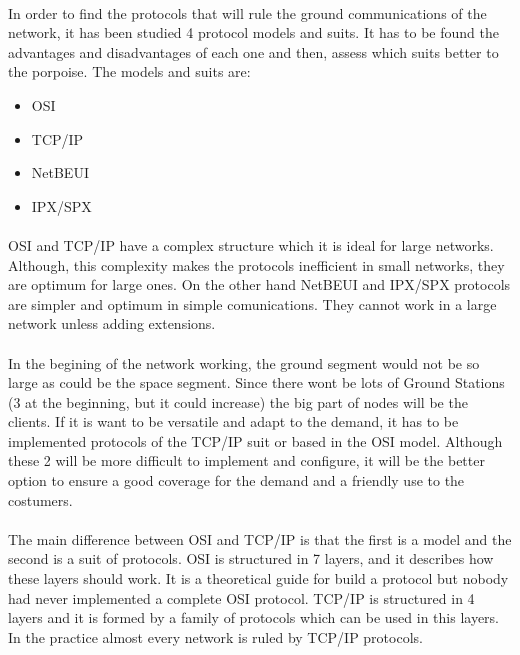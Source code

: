 \paragraph{}
In order to find the protocols that will rule the ground communications of the network, it has been studied 4 protocol models and suits. It has to be found the advantages and disadvantages of each one and then, assess which suits better to the porpoise. The models and suits are:
\begin{itemize}
\item OSI
\item TCP/IP
\item NetBEUI
\item IPX/SPX
\end{itemize}
\paragraph{} 
OSI and TCP/IP have a complex structure which it is ideal for large networks. Although, this complexity makes the protocols inefficient in small networks, they are optimum for large ones. On the other hand NetBEUI and IPX/SPX protocols are simpler and optimum in simple comunications. They cannot work in a large network unless adding extensions. 
\paragraph{}
In the begining of the network working, the ground segment would not be so large as could be the space segment. Since there wont be lots of Ground Stations (3 at the beginning, but it could increase) the big part of nodes will be the clients. If it is want to be versatile and adapt to the demand, it has to be implemented protocols of the TCP/IP suit or based in the OSI model. Although these 2 will be more difficult to implement and configure, it will be the better option to ensure a good coverage for the demand and a friendly use to the costumers.
\paragraph{}
The main difference between OSI and TCP/IP is that the first is a model and the second is a suit of protocols. OSI is structured in 7 layers, and it describes how these layers should work. It is a theoretical guide for build a protocol but nobody had never implemented a complete OSI protocol. TCP/IP is structured in 4 layers and it is formed by a family of protocols which can be used in this layers. In the practice almost every network is ruled by TCP/IP protocols. 
